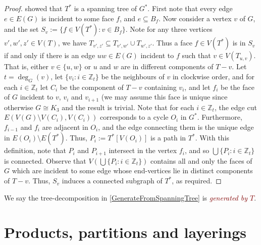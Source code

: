 \documentclass[11pt]{article}
\newcommand{\defn}[1]{\textcolor{Maroon}{\emph{#1}}}
\theoremstyle{plain}
\theoremstyle{definition}
\begin{document}
		\begin{proof}
			\citet{vonStaudt} showed that $T^*$ is a spanning tree of $G^*$.  
			First note that every edge $e\in E(G)$ is incident to some face $f$, and $e\subseteq B_f$. Now consider a vertex $v$ of $G$, and the set $S_v:=\{f\in V(T^*):v\in B_f\}$.
			Note for any three vertices $v',w',z'\in V(T)$, we have $T_{v',z'}\subseteq T_{v',w'}\cup T_{w',z'}$.
			Thus a face $f\in V(T^*)$ is in $S_v$ if and only if there is an edge $uw\in E(G)$ incident to $f$ such that $v\in V(T_{u,v})$.
			That is, either $v\in \{u,w\}$ or $u$ and $w$ are in different components of $T-v$.
			Let $t=\deg_G(v)$, let $\{v_i:i\in \mathbb{Z}_t\}$ be the neighbours of $v$ in clockwise order, and for each $i\in \mathbb{Z}_t$ let $C_i$ be the component of $T-v$ containing $v_i$, and let $f_i$ be the face of $G$ incident to $v$, $v_i$ and $v_{i+1}$ (we may assume this face is unique since otherwise $G\cong K_3$ and the result is trivial.
			Note that for each $i\in \mathbb{Z}_t$, the edge cut $E(V(G)\setminus V(C_i),V(C_i))$ corresponds to a cycle $O_i$ in $G^*$. Furthermore, $f_{i-1}$ and $f_i$ are adjacent in $O_i$, and the edge connecting them is the unique edge in $E(O_i)\setminus E(T^*)$. Thus, $P_i:=T^*[V(O_i)]$ is a path in $T^*$.
			With this definition, note that $P_i$ and $P_{i+1}$ intersect in the vertex $f_i$, and so 
			$\bigcup \{P_i:i\in \mathbb{Z}_t\}$ is connected.
			Observe that $V(\bigcup \{P_i:i\in \mathbb{Z}_t\})$ contains all and only the faces of $G$ which are incident to some edge whose end-vertices lie in distinct components of $T-v$. 
			Thus, $S_v$ induces a connected subgraph of $T^*$, as required.\end{proof}
		
		We say the tree-decomposition in \cref{GenerateFromSpanningTree} is \defn{generated by $T$}.
		
		\section{Products, partitions and layerings}
        \label{sec:prodpartlay}
		
\end{document}
